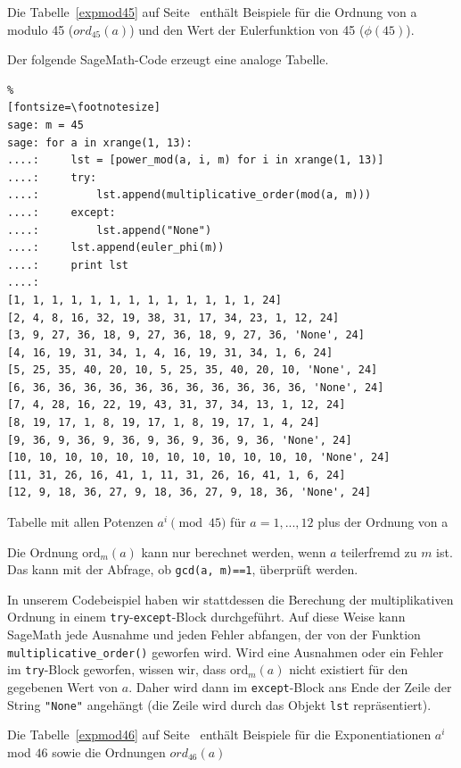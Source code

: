 \begin{refsegment}
\hypertarget{nt:AppArith3b}{}
\label{nt:AppArith3b}{}
Die Tabelle~\ref{expmod45} auf Seite~\pageref{SrcArith3b} enthält Beispiele
für die Ordnung von a modulo 45 ($ord_{45}(a)$) und den Wert der Eulerfunktion
von 45 ($\phi(45)$).

Der folgende SageMath-Code erzeugt eine analoge Tabelle.

\begin{sagecode}
\begin{Verbatim}%
[fontsize=\footnotesize]
sage: m = 45
sage: for a in xrange(1, 13):
....:     lst = [power_mod(a, i, m) for i in xrange(1, 13)]
....:     try:
....:         lst.append(multiplicative_order(mod(a, m)))
....:     except:
....:         lst.append("None")
....:     lst.append(euler_phi(m))
....:     print lst
....:
[1, 1, 1, 1, 1, 1, 1, 1, 1, 1, 1, 1, 1, 24]
[2, 4, 8, 16, 32, 19, 38, 31, 17, 34, 23, 1, 12, 24]
[3, 9, 27, 36, 18, 9, 27, 36, 18, 9, 27, 36, 'None', 24]
[4, 16, 19, 31, 34, 1, 4, 16, 19, 31, 34, 1, 6, 24]
[5, 25, 35, 40, 20, 10, 5, 25, 35, 40, 20, 10, 'None', 24]
[6, 36, 36, 36, 36, 36, 36, 36, 36, 36, 36, 36, 'None', 24]
[7, 4, 28, 16, 22, 19, 43, 31, 37, 34, 13, 1, 12, 24]
[8, 19, 17, 1, 8, 19, 17, 1, 8, 19, 17, 1, 4, 24]
[9, 36, 9, 36, 9, 36, 9, 36, 9, 36, 9, 36, 'None', 24]
[10, 10, 10, 10, 10, 10, 10, 10, 10, 10, 10, 10, 'None', 24]
[11, 31, 26, 16, 41, 1, 11, 31, 26, 16, 41, 1, 6, 24]
[12, 9, 18, 36, 27, 9, 18, 36, 27, 9, 18, 36, 'None', 24]
\end{Verbatim}
\caption{Tabelle mit allen Potenzen $a^i \pmod{45}$ für $a=1,...,12$ plus der Ordnung von a}
\label{nt_Sage-code_MultOrder_expmod45}
\end{sagecode}

Die Ordnung $\text{ord}_m(a)$ kann nur berechnet werden, wenn $a$
teilerfremd zu $m$ ist.
Das kann mit der Abfrage, ob \verb!gcd(a, m)==1!, überprüft werden.

In unserem Codebeispiel haben wir stattdessen die Berechung der
multiplikativen Ordnung in einem \verb!try!-\verb!except!-Block
durchgeführt. Auf diese Weise kann SageMath jede Ausnahme und jeden Fehler
abfangen, der von der Funktion \verb!multiplicative_order()! geworfen wird.
Wird eine Ausnahmen oder ein Fehler im \verb!try!-Block geworfen, wissen
wir, dass $\text{ord}_m(a)$ nicht existiert für den gegebenen Wert von $a$.
Daher wird dann im \verb!except!-Block ans Ende der Zeile der String \verb!"None"!
angehängt (die Zeile wird durch das Objekt \verb!lst! repräsentiert).


\hypertarget{nt:AppArith3c}{}
\label{nt:AppArith3c}{}
Die Tabelle~\ref{expmod46} auf Seite~\pageref{SrcArith3c} enthält Beispiele
für die Exponentiationen $a^i$ mod $46$ sowie die Ordnungen $ord_{46}(a)$


\end{refsegment}
